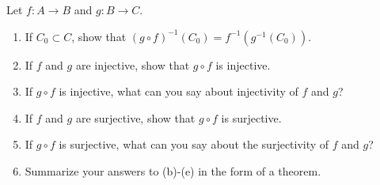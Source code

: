 \documentclass[12pt]{article}
\newenvironment{problem}[2][Exercise]{\begin{trivlist}
\item[\hskip \labelsep {\bfseries #1}\hskip \labelsep {\bfseries #2.}]}{\end{trivlist}}
\begin{document}
\begin{problem}{1.2.4}
Let $f:A\rightarrow B$ and $g:B\rightarrow C$.
\begin{enumerate}[label=(\alph*)]
	\item If $C_0 \subset C$, show that $\left(g\circ f\right)^{-1}\left(C_0\right) = f^{-1}\left(g^{-1}\left(C_0\right)\right)$.
	\item If $f$ and $g$ are injective, show that $g \circ f$ is injective.
	\item If $g \circ f$ is injective, what can you say about injectivity of $f$ and $g$?
	\item If $f$ and $g$ are surjective, show that $g\circ f$ is surjective.
	\item If $g\circ f$ is surjective, what can you say about the surjectivity of $f$ and $g$?
	\item Summarize your answers to (b)-(e) in the form of a theorem.
\end{enumerate}
\end{problem}
\end{document}
